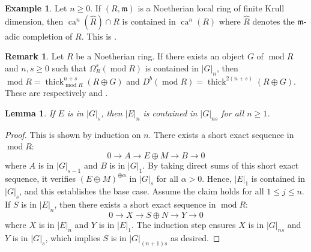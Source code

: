 \documentclass[11pt]{amsart}
\theoremstyle{plain}
\newtheorem{lemma}[theorem]{Lemma}
\theoremstyle{definition}
\newtheorem{example}[theorem]{Example}
\newtheorem{remark}[theorem]{Remark}
\numberwithin{equation}{section}
\numberwithin{theorem}{section}
\begin{document}
\begin{example}\label{ex:BHST_completion_cohomology_annihilator}
    Let $n\geq 0$. If $(R,\mathfrak{m})$ is a Noetherian local ring of finite Krull dimension, then $\operatorname{ca}^n (\widehat{R})\cap R$ is contained in $\operatorname{ca}^n (R)$ where $\widehat{R}$ denotes the $\mathfrak{m}$-adic completion of $R$. This is \cite[Theorem 4.5.1]{BHST:2016}. 
\end{example}

\begin{remark}\label{rmk:strong_generator_to_derived_category}
    Let $R$ be a Noetherian ring. If there exists an object $G$ of $\operatorname{mod}R$ and $n,s\geq 0$ such that $\Omega^s_R (\operatorname{mod}R)$ is contained in $|G|_n$, then $\operatorname{mod}R = \operatorname{thick}_{\operatorname{mod}R}^{n+s} (R\oplus G)$ and $D^b (\operatorname{mod}R) = \operatorname{thick}^{2(n+s)} (R\oplus G)$. These are respectively \cite[Corollary 4.6]{Iyengar/Takahashi:2016} and \cite[Lemma 7.1]{Iyengar/Takahashi:2016}.
\end{remark}

\begin{lemma}\label{lem:ext_prop}
    If $E$ is in $ |G|_s$, then $|E|_n $ is contained in $|G|_{ns}$ for all $n\geq 1$.
\end{lemma}

\begin{proof}
    This is shown by induction on $n$. There exists a short exact sequence in $\operatorname{mod}R$:
    \begin{displaymath}
        0 \to A \to E \oplus M \to B \to 0
    \end{displaymath}
    where $A $ is in $ |G|_{s-1}$ and $B$ is in $ |G|_1$. By taking direct sums of this short exact sequence, it verifies $(E\oplus M)^{\oplus \alpha}$ in $ |G|_s$ for all $\alpha>0$. Hence, $|E|_1 $ is contained in $|G|_s$, and this establishes the base case. Assume the claim holds for all $1\leq j \leq n$. If $S$ is in $ |E|_n$, then there exists a short exact sequence in $\operatorname{mod}R$:
    \begin{displaymath}
        0 \to X \to S \oplus N \to Y \to 0
    \end{displaymath}
    where $X $ is in $ |E|_n$ and $Y$ is in $ |E|_1$. The induction step ensures $X $ is in $ |G|_{ns}$ and $Y$ is in $ |G|_s$, which implies $S$ is in $ |G|_{(n+1)s}$ as desired.
\end{proof}
\end{document}
